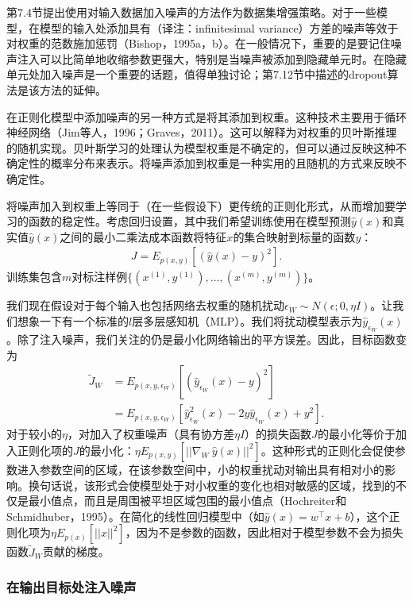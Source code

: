 第7.4节提出使用对输入数据加入噪声的方法作为数据集增强策略。对于一些模型，在模型的输入处添加具有（译注：inﬁnitesimal variance）方差的噪声等效于对权重的范数施加惩罚（Bishop，1995a，b）。在一般情况下，重要的是要记住噪声注入可以比简单地收缩参数更强大，特别是当噪声被添加到隐藏单元时。在隐藏单元处加入噪声是一个重要的话题，值得单独讨论；第7.12节中描述的dropout算法是该方法的延伸。

在正则化模型中添加噪声的另一种方式是将其添加到权重。这种技术主要用于循环神经网络（Jim等人，1996；Graves，2011）。这可以解释为对权重的贝叶斯推理的随机实现。贝叶斯学习的处理认为模型权重是不确定的，但可以通过反映这种不确定性的概率分布来表示。将噪声添加到权重是一种实用的且随机的方式来反映不确定性。

将噪声加入到权重上等同于（在一些假设下）更传统的正则化形式，从而增加要学习的函数的稳定性。考虑回归设置，其中我们希望训练使用在模型预测$\hat{y}(x)$和真实值$\hat{y}(x)$之间的最小二乘法成本函数将特征$x$的集合映射到标量的函数$y$：
$$
\begin{aligned}
J = E_{p(x,y)}[(\hat y(x) - y)^2].
\end{aligned}
$$
训练集包含$m$对标注样例$\{(x^{(1)}, y^{(1)}),\dots,(x^{(m)}, y^{(m)})\}$。

我们现在假设对于每个输入也包括网络去权重的随机扰动$\epsilon _W \sim N(\epsilon;0, \eta I )$。让我们想象一下有一个标准的$l$层多层感知机（MLP）。我们将扰动模型表示为$\hat{y}_{\epsilon_W} (x)$。除了注入噪声，我们关注的仍是最小化网络输出的平方误差。因此，目标函数变为
$$
\begin{aligned}
\tilde J_{W}
&= E_{p(x,y,\epsilon_{W})}[(\hat y_{\epsilon_{W}}(x) - y)^2] \\
&= E_{p(x,y,\epsilon_{W})}[\hat y_{\epsilon_{W}}^2(x) - 2y\hat y_{\epsilon_{W}} (x)+ y^2] .
\end{aligned}
$$
对于较小的$\eta$，对加入了权重噪声（具有协方差$\eta I$）的损失函数$J$的最小化等价于加入正则化项的$J$的最小化：$\eta E_{p(x,y)}[||\nabla_{W}~\hat y(x)||^2]$。这种形式的正则化会促使参数进入参数空间的区域，在该参数空间中，小的权重扰动对输出具有相对小的影响。换句话说，该形式会使模型处于对小权重的变化也相对敏感的区域，找到的不仅是最小值点，而且是周围被平坦区域包围的最小值点（Hochreiter和Schmidhuber，1995）。在简化的线性回归模型中（如$\hat{y}(x) = w^\top x + b$），这个正则化项为$\eta E_{p(x)}[||x||^2]$，因为不是参数的函数，因此相对于模型参数不会为损失函数$\widetilde{J}_W$贡献的梯度。

\subsubsection{在输出目标处注入噪声}

